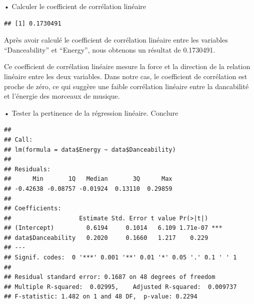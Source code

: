 \documentclass[
]{article}
\newenvironment{Shaded}{\begin{snugshade}}{\end{snugshade}}
\newcommand{\CommentTok}[1]{\textcolor[rgb]{0.56,0.35,0.01}{\textit{#1}}}
\newcommand{\FunctionTok}[1]{\textcolor[rgb]{0.00,0.00,0.00}{#1}}
\newcommand{\NormalTok}[1]{#1}
\newcommand{\OtherTok}[1]{\textcolor[rgb]{0.56,0.35,0.01}{#1}}
\newcommand{\SpecialCharTok}[1]{\textcolor[rgb]{0.00,0.00,0.00}{#1}}
\begin{document}
• Calculer le coefficient de corrélation linéaire

\begin{Shaded}
\end{Shaded}

\begin{verbatim}
## [1] 0.1730491
\end{verbatim}

Après avoir calculé le coefficient de corrélation linéaire entre les
variables ``Danceability'' et ``Energy'', nous obtenons un résultat de
0.1730491.

Ce coefficient de corrélation linéaire mesure la force et la direction
de la relation linéaire entre les deux variables. Dans notre cas, le
coefficient de corrélation est proche de zéro, ce qui suggère une faible
corrélation linéaire entre la dancabilité et l'énergie des morceaux de
musique.

• Tester la pertinence de la régression linéaire. Conclure

\begin{Shaded}
\end{Shaded}

\begin{verbatim}
## 
## Call:
## lm(formula = data$Energy ~ data$Danceability)
## 
## Residuals:
##      Min       1Q   Median       3Q      Max 
## -0.42638 -0.08757 -0.01924  0.13110  0.29859 
## 
## Coefficients:
##                   Estimate Std. Error t value Pr(>|t|)    
## (Intercept)         0.6194     0.1014   6.109 1.71e-07 ***
## data$Danceability   0.2020     0.1660   1.217    0.229    
## ---
## Signif. codes:  0 '***' 0.001 '**' 0.01 '*' 0.05 '.' 0.1 ' ' 1
## 
## Residual standard error: 0.1687 on 48 degrees of freedom
## Multiple R-squared:  0.02995,    Adjusted R-squared:  0.009737 
## F-statistic: 1.482 on 1 and 48 DF,  p-value: 0.2294
\end{verbatim}
\end{document}
